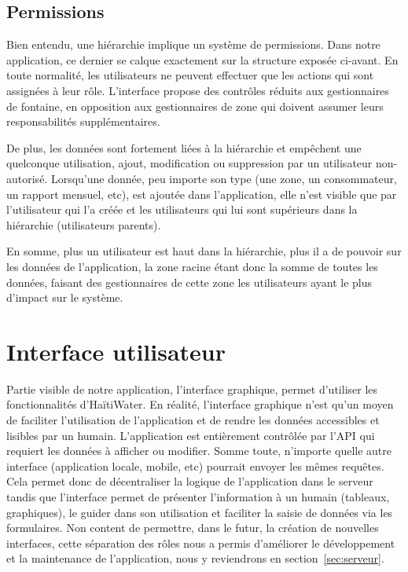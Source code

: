 \documentclass{EPL-master-thesis-covers-FR}
\begin{document}
			\subsection*{Permissions}
				Bien entendu, une hiérarchie implique un système de permissions. Dans notre application, ce dernier se calque exactement sur la structure exposée ci-avant. En toute normalité, les utilisateurs ne peuvent effectuer que les actions qui sont assignées à leur rôle. L'interface propose des contrôles réduits aux gestionnaires de fontaine, en opposition aux gestionnaires de zone qui doivent assumer leurs responsabilités supplémentaires.

				De plus, les données sont fortement liées à la hiérarchie et empêchent une quelconque utilisation, ajout, modification ou suppression par un utilisateur non-autorisé. Lorsqu'une donnée, peu importe son type (une zone, un consommateur, un rapport mensuel, etc), est ajoutée dans l'application, elle n'est visible que par l'utilisateur qui l'a créée et les utilisateurs qui lui sont supérieurs dans la hiérarchie (utilisateurs parents).

				En somme, plus un utilisateur est haut dans la hiérarchie, plus il a de pouvoir sur les données de l'application, la zone racine étant donc la somme de toutes les données, faisant des gestionnaires de cette zone les utilisateurs ayant le plus d'impact sur le système.

		\section{Interface utilisateur}


			Partie visible de notre application, l'interface graphique, permet d'utiliser les fonctionnalités d'HaïtiWater. En réalité, l'interface graphique n'est qu'un moyen de faciliter l'utilisation de l'application et de rendre les données accessibles et lisibles par un humain. L'application est entièrement contrôlée par l'API qui requiert les données à afficher ou modifier. Somme toute, n'importe quelle autre interface (application locale, mobile, etc) pourrait envoyer les mêmes requêtes. Cela permet donc de décentraliser la logique de l'application dans le serveur tandis que l'interface permet de présenter l'information à un humain (tableaux, graphiques), le guider dans son utilisation et faciliter la saisie de données via les formulaires. Non content de permettre, dans le futur, la création de nouvelles interfaces, cette séparation des rôles nous a permis d'améliorer le développement et la maintenance de l'application, nous y reviendrons en section~\ref{sec:serveur}.
\end{document}
